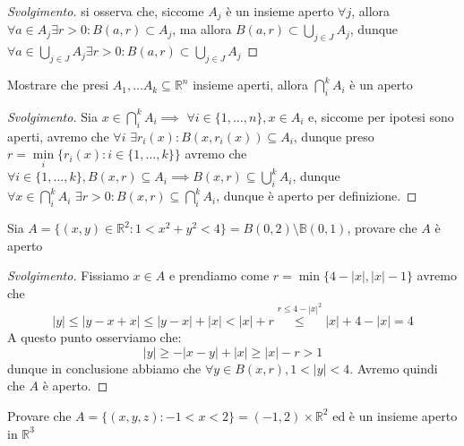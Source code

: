 \begin{proof}[Svolgimento]
si osserva che, siccome $A_j$ è un insieme aperto $\forall j$, allora $\forall a \in A_j \exists r > 0: B(a, r) \subset A_j$, ma allora $B(a, r) \subset \bigcup\limits_{j \in J} A_j$, dunque $\forall a \in \bigcup\limits_{j \in J} A_j \exists r > 0: B(a, r) \subset \bigcup\limits_{j \in J} A_j$
\end{proof}
\begin{exercise}
Mostrare che presi $A_1, \ldots A_k \subseteq \mathbb{R}^n$ insieme aperti, allora $\bigcap\limits_i^k A_i$ è un aperto
\label{exercise:intersec_open_set_is_open}
\end{exercise}
\begin{proof}[Svolgimento]
Sia $x \in \bigcap\limits_{i}^k A_i \implies \, \, \forall i \in \{1, \ldots, n \}, x \in A_i$ e, siccome per ipotesi sono aperti, avremo che $\forall i \, \, \exists r_i(x) : B(x, r_i(x)) \subseteq A_i$, dunque preso $r=\min\limits_i{ \{ r_i(x) : i \in \{1, \ldots, k \} \} }$ avremo che $\forall i \in \{1, \ldots, k \}, B(x, r) \subseteq A_i \implies B(x, r) \subseteq \bigcup\limits_i^k A_i$,
dunque $\forall x \in \bigcap\limits_{i}^k A_i \, \, \exists r > 0 : B(x, r) \subseteq \bigcap\limits_i^k A_i$, dunque è aperto per definizione.
\end{proof}
\begin{exercise}
Sia $A=\{(x, y) \in \mathbb{R}^2 : 1 < x^2 + y^2 < 4 \} = B(0, 2) \setminus \mathbb{B}(0,1)$, provare che $A$ è aperto
\end{exercise}
\begin{proof}[Svolgimento]
	Fissiamo $x \in A$ e prendiamo come $r=\min{ \{ 4-|x|, |x|-1 \} }$ avremo che
	$$
	|y| \leq |y-x+x| \leq |y-x| + |x| < |x| + r \stackrel{r \leq 4 - |x|^2}{\leq} |x| + 4 - |x| = 4
	$$
	A questo punto osserviamo che:
	$$
	|y| \geq -|x-y| + |x| \geq |x| - r > 1
	$$
	dunque in conclusione abbiamo che $\forall y \in B(x, r), 1 < |y| < 4$. Avremo quindi che $A$ è aperto.
\end{proof}
\begin{exercise}
Provare che $A = \{(x, y, z) : -1 < x < 2 \} = (-1, 2) \times \mathbb{R}^2$ ed è un insieme aperto in $\mathbb{R}^3$
\end{exercise}
